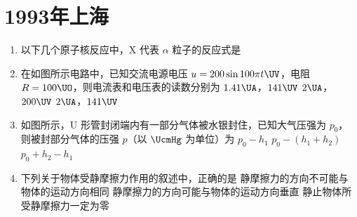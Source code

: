 \documentclass[\gkver]{gaokaozhenti}
\begin{document}
\chapter{1993年上海}

\begin{enumerate}
\item
以下几个原子核反应中，X 代表 $\alpha$ 粒子的反应式是
{}
{}
{}

\item
在如图所示电路中，已知交流电源电压 $u = 200\sin 100\pi t\UV$，电阻 $R = 100\UO$，则电流表和电压表的读数分别为
\onepicture[w=3.59cm]{}
{$1.41\UA$，$141\UV$}
{$2\UA$，$200\UV$}
{$2\UA$，$141\UV$}

\item
如图所示，U 形管封闭端内有一部分气体被水银封住，已知大气压强为 $p_{0}$，则被封部分气体的压强 $p$（以 $\UcmHg$ 为单位）为
\onepicture[h=3.79cm]{}
{$p_{0} - h_{1}$}
{$p_{0} - (h_{1} + h_{2})$}
{$p_{0} + h_{2} - h_{1}$}

\item
下列关于物体受静摩擦力作用的叙述中，正确的是
{静摩擦力的方向不可能与物体的运动方向相同}
{静摩擦力的方向可能与物体的运动方向垂直}
{静止物体所受静摩擦力一定为零}


\end{enumerate}
\end{document}
